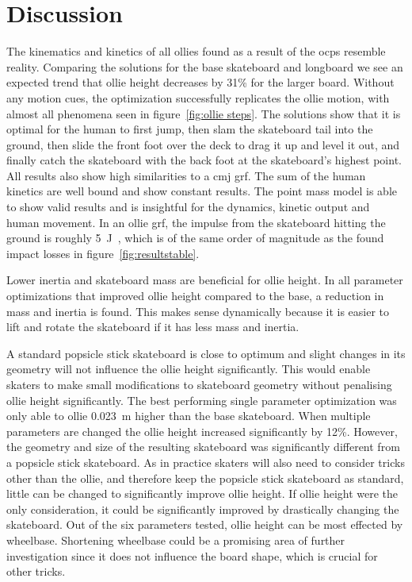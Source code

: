 \documentclass[default,iicol]{sn-jnl}
\begin{document}
\section{Discussion}
The kinematics and kinetics of all ollies found as a result of the \glspl{ocp} resemble reality.
Comparing the solutions for the base skateboard and longboard we see an expected trend that ollie height decreases by 31\% for the larger board.
Without any motion cues, the optimization successfully replicates the ollie motion, with almost all phenomena seen in figure~\ref{fig:ollie steps}.
The solutions show that it is optimal for the human to first jump, then slam the skateboard tail into the ground, then slide the front foot over the deck to drag it up and level it out, and finally catch the skateboard with the back foot at the skateboard's highest point.
All results also show high similarities to a \gls{cmj} \gls{grf}.
The sum of the human kinetics are well bound and show constant results.
The point mass model is able to show valid results and is insightful for the dynamics, kinetic output and human movement.
In an ollie \gls{grf}, the impulse from the skateboard hitting the ground is roughly \SI{5}{\joule}~\cite{determan_kinetics_2006}, which is of the same order of magnitude as the found impact losses in figure~\ref{fig:resultstable}.

Lower inertia and skateboard mass are beneficial for ollie height.
In all parameter optimizations that improved ollie height compared to the base, a reduction in mass and inertia is found.
This makes sense dynamically because it is easier to lift and rotate the skateboard if it has less mass and inertia.

A standard popsicle stick skateboard is close to optimum and slight changes in its geometry will not influence the ollie height significantly.
This would enable skaters to make small modifications to skateboard geometry without penalising ollie height significantly.
The best performing single parameter optimization was only able to ollie \SI{0.023}{\meter} higher than the base skateboard.
When multiple parameters are changed the ollie height increased significantly by 12\%.
However, the geometry and size of the resulting skateboard was significantly different from a popsicle stick skateboard.
As in practice skaters will also need to consider tricks other than the ollie, and therefore keep the popsicle stick skateboard as standard, little can be changed to significantly improve ollie height.
If ollie height were the only consideration, it could be significantly improved by drastically changing the skateboard.
Out of the six parameters tested, ollie height can be most effected by wheelbase.
Shortening wheelbase could be a promising area of further investigation since it does not influence the board shape, which is crucial for other tricks.
\end{document}
